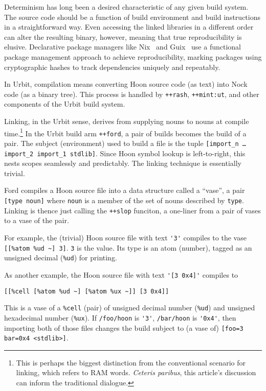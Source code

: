 \documentclass[twoside]{article}
\begin{document}
Determinism has long been a desired characteristic of any given build system.  The source code should be a function of build environment and build instructions in a straightforward way.  Even accessing the linked libraries in a different order can alter the resulting binary, however, meaning that true reproducibility is elusive.  Declarative package managers like Nix \citep{Nix}~and Guix \citep{Guix}~use a functional package management approach to achieve reproducibility, marking packages using cryptographic hashes to track dependencies uniquely and repeatably.

In Urbit, compilation means converting Hoon source code (as text) into Nock code (as a binary tree).  This process is handled by \lstinline[style=inlinecode]{++rash}, \lstinline[style=inlinecode]{++mint:ut}, and other components of the Urbit build system.

Linking, in the Urbit sense, derives from supplying nouns to nouns at compile time.\footnote{This is perhaps the biggest distinction from the conventional scenario for linking, which refers to RAM words.  \emph{Ceteris paribus}, this article's discussion can inform the traditional dialogue.}  In the Urbit build arm \lstinline[style=inlinecode]{++ford}, a pair of builds becomes the build of a pair.  The subject (environment) used to build a file is the tuple \lstinline[style=inlinecode]{[import_n … import_2 import_1 stdlib]}.  Since Hoon symbol lookup is left-to-right, this nests scopes seamlessly and predictably.  The linking technique is essentially trivial.

Ford compiles a Hoon source file into a data structure called a “vase”, a pair \lstinline[style=inlinecode]{[type noun]} where \lstinline[style=inlinecode]{noun} is a member of the set of nouns described by \lstinline[style=inlinecode]{type}.  Linking is thence just calling the \lstinline[style=inlinecode]{++slop} funciton, a one-liner from a pair of vases to a vase of the pair.

For example, the (trivial) Hoon source file with text \lstinline[style=inlinecode]{'3'} compiles to the vase \lstinline[style=inlinecode]{[[%atom %ud ~] 3]}.  \lstinline[style=inlinecode]{3} is the value.  Its type is an atom (number), tagged as an unsigned decimal (\lstinline[style=inlinecode]{%ud}) for printing.

As another example, the Hoon source file with text \lstinline[style=inlinecode]{'[3 0x4]'} compiles to
\begin{lstlisting}[style=listingblock]
[[%cell [%atom %ud ~] [%atom %ux ~]] [3 0x4]]
\end{lstlisting}
\noindent
This is a vase of a \lstinline[style=inlinecode]{%cell} (pair) of unsigned decimal number (\lstinline[style=inlinecode]{%ud}) and unsigned hexadecimal number (\lstinline[style=inlinecode]{%ux}).  If \lstinline[style=inlinecode]{/foo/hoon} is \lstinline[style=inlinecode]{'3'}, \lstinline[style=inlinecode]{/bar/hoon} is \lstinline[style=inlinecode]{'0x4'}, then importing both of those files changes the build subject to (a vase of) \lstinline[style=inlinecode]{[foo=3 bar=0x4 <stdlib>]}.
\end{document}
